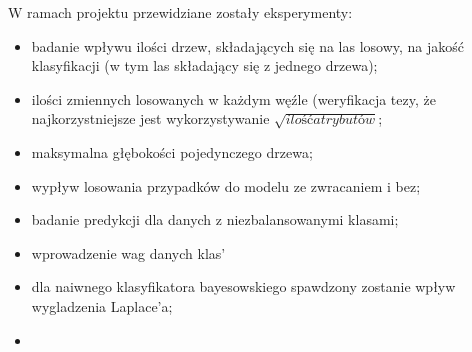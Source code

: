 W ramach projektu przewidziane zostały eksperymenty:
\begin{itemize}
    \item badanie wpływu ilości drzew, składających się na las losowy, na jakość klasyfikacji (w tym las składający się z jednego drzewa);
    \item ilości zmiennych losowanych w każdym węźle (weryfikacja tezy, że najkorzystniejsze jest wykorzystywanie $\sqrt {ilość atrybutów}$;
    \item maksymalna głębokości pojedynczego drzewa;
    \item wypływ losowania przypadków do modelu ze zwracaniem i bez;
    \item badanie predykcji dla danych z niezbalansowanymi klasami;
        \item wprowadzenie wag danych klas'
        \item dla naiwnego klasyfikatora bayesowskiego spawdzony zostanie wpływ wygladzenia Laplace'a;
        \item {}
        
\end{itemize}
